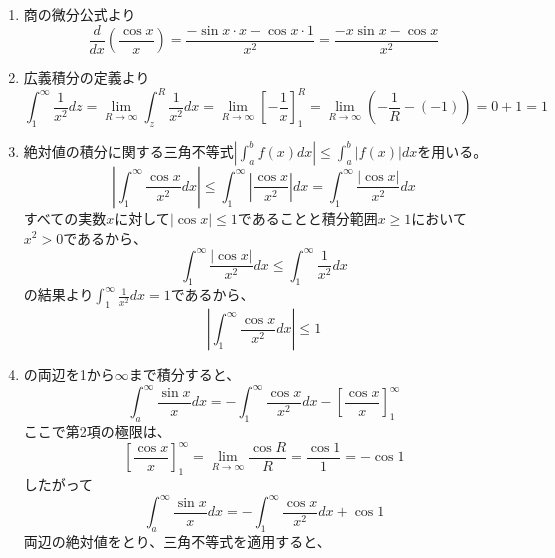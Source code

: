 \begin{souanswer} %
\begin{enumerate}
    \item\label{R8_3rd_3(1)} 商の微分公式より
\begin{equation*}
    \frac{d}{dx}\left(\frac{\cos{x}}{x}\right)= \frac{-\sin{x}\cdot x- \cos{x}\cdot 1}{x^2}= \frac{-x\sin{x}- \cos{x}}{x^2}
\end{equation*}
    \item\label{R8_3rd_3(2)} 広義積分の定義より
\begin{equation*}
    \int_1^\infty \frac{1}{x^2}dz
	= \lim_{R\to \infty}\int_z^R \frac{1}{x^2}dx
    = \lim_{R\to \infty} \left[-\frac{1}{x}\right]_1^R
    = \lim_{R\to \infty}\left(-\frac{1}{R}- (-1)\right)= 0+ 1= 1
\end{equation*}
    \item\label{R8_3rd_3(3)} 絶対値の積分に関する三角不等式$\left|\int_a^b f(x)dx\right|\le \int_a^b|f(x)|dx$を用いる。
\begin{equation*}
	\left|\int_1^\infty \frac{\cos{x}}{x^2}dx \right|
	\le \int_1^\infty \left|\frac{\cos{x}}{x^2}\right|dx
	= \int_1^\infty \frac{|\cos{x}|}{x^2}dx
\end{equation*}
	すべての実数$x$に対して$|\cos{x}|\le 1$であることと積分範囲$x\ge 1$において$x^2> 0$であるから、
\begin{equation*}
	\int_1^\infty \frac{|\cos{x}|}{x^2}dx\le \int_1^\infty \frac{1}{x^2}dx
\end{equation*}
	の結果より$\int_1^\infty \frac{1}{x^2}dx= 1$であるから、
\begin{equation*}
	\left|\int_1^\infty \frac{\cos{x}}{x^2}dx\right|\le 1
\end{equation*}
	\item {}の両辺を1から$\infty$まで積分すると、
\begin{equation*}
	\int_a^\infty \frac{\sin{x}}{x}dx= -\int_1^\infty \frac{\cos{x}}{x^2}dx- \left[\frac{\cos{x}}{x}\right]_1^\infty
\end{equation*}
	ここで第2項の極限は、
\begin{equation*}
	\left[\frac{\cos{x}}{x}\right]_1^\infty= \lim_{R\to \infty}\frac{\cos{R}}{R}= \frac{\cos{1}}{1}= -\cos{1}
\end{equation*}
	したがって
\begin{equation*}
	\int_a^\infty \frac{\sin{x}}{x}dx= -\int_1^\infty \frac{\cos{x}}{x^2}dx+ \cos{1}
\end{equation*}
	両辺の絶対値をとり、三角不等式を適用すると、

\end{enumerate}
\end{souanswer}
